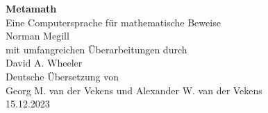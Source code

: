 
\pagestyle{headings}

\thispagestyle{empty}

\hfill
\vfill

\begin{center}
{\LARGE\bf Metamath} \\
\vspace{1ex}
{\large Eine Computersprache für mathematische Beweise} \\
\vspace{7ex}
{\large Norman Megill} \\
\vspace{7ex}
mit umfangreichen Überarbeitungen durch \\
\vspace{1ex}
{\large David A. Wheeler} \\
\vspace{7ex}
Deutsche Übersetzung von \\
\vspace{1ex}
{\large Georg M. van der Vekens und Alexander W. van der Vekens} \\
\vspace{7ex}
15.12.2023
\end{center}

\vfill
\hfill

\newpage
\thispagestyle{empty}

\hfill
\vfill


